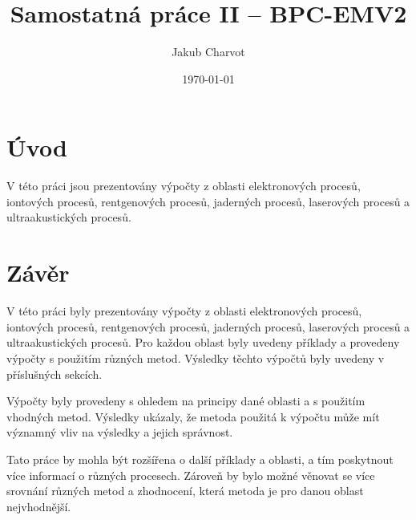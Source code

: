 \documentclass[a4paper,onecolumn,12pt]{article}
\begin{document}
\title{Samostatná práce II – BPC-EMV2}
\author{Jakub Charvot}
\date{\czdate\today}
\maketitle

\section*{Úvod}

V této práci jsou prezentovány výpočty z oblasti elektronových procesů, iontových procesů, rentgenových procesů, jaderných procesů, laserových procesů a ultraakustických procesů.















\section*{Závěr}

V této práci byly prezentovány výpočty z oblasti elektronových procesů, iontových procesů, rentgenových procesů, 
jaderných procesů, laserových procesů a ultraakustických procesů. Pro každou oblast byly uvedeny příklady a provedeny výpočty s použitím různých metod. Výsledky těchto výpočtů byly uvedeny v příslušných sekcích.

Výpočty byly provedeny s ohledem na principy dané oblasti a s použitím vhodných metod. Výsledky ukázaly, že metoda použitá k výpočtu může mít významný vliv na výsledky a jejich správnost.

Tato práce by mohla být rozšířena o další příklady a oblasti, a tím poskytnout více informací o různých procesech. Zároveň by bylo možné věnovat se více srovnání různých metod a zhodnocení, která metoda je pro danou oblast nejvhodnější.
\end{document}
